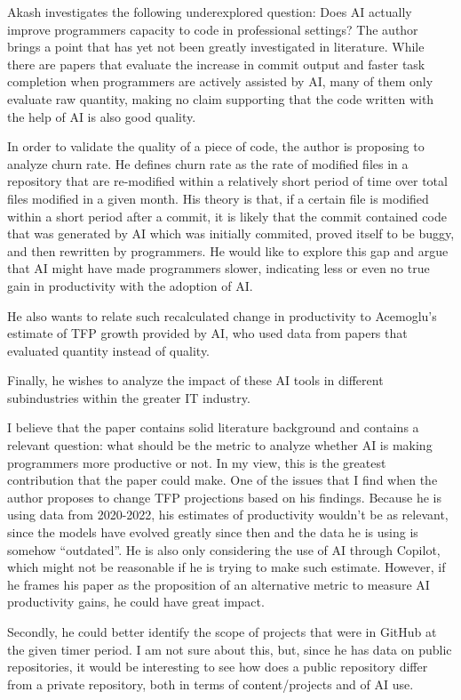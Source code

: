 \documentclass[12pt, a4paper]{article}
\begin{document}
{}

\vspace{1cm}

Akash investigates the following underexplored question: Does AI actually improve programmers capacity to code in professional settings? The author brings a point that has yet not been greatly investigated in literature. While there are papers that evaluate the increase in commit output and faster task completion when programmers are actively assisted by AI, many of them only evaluate raw quantity, making no claim supporting that the code written with the help of AI is also good quality.

In order to validate the quality of a piece of code, the author is proposing to analyze churn rate. He defines churn rate as the rate of modified files in a repository that are re-modified within a relatively short period of time over total files modified in a given month. His theory is that, if a certain file is modified within a short period after a commit, it is likely that the commit contained code that was generated by AI which was initially commited, proved itself to be buggy, and then rewritten by programmers. He would like to explore this gap and argue that AI might have made programmers slower, indicating less or even no true gain in productivity with the adoption of AI.

He also wants to relate such recalculated change in productivity to Acemoglu's estimate of TFP growth provided by AI, who used data from papers that evaluated quantity instead of quality.

Finally, he wishes to analyze the impact of these AI tools in different subindustries within the greater IT industry.

I believe that the paper contains solid literature background and contains a relevant question: what should be the metric to analyze whether AI is making programmers more productive or not. In my view, this is the greatest contribution that the paper could make. One of the issues that I find when the author proposes to change TFP projections based on his findings. Because he is using data from 2020-2022, his estimates of productivity wouldn't be as relevant, since the models have evolved greatly since then and the data he is using is somehow ``outdated''. He is also only considering the use of AI through Copilot, which might not be reasonable if he is trying to make such estimate. However, if he frames his paper as the proposition of an alternative metric to measure AI productivity gains, he could have great impact.

Secondly, he could better identify the scope of projects that were in GitHub at the given timer period. I am not sure about this, but, since he has data on public repositories, it would be interesting to see how does a public repository differ from a private repository, both in terms of content/projects and of AI use. 
\end{document}
